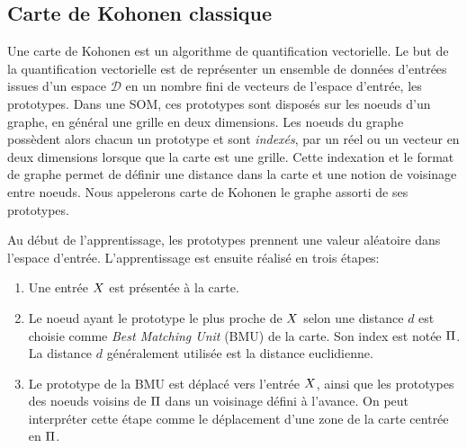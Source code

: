 \documentclass[../main]{subfiles}
\begin{document}
\subsection{Carte de Kohonen classique}

Une carte de Kohonen est un algorithme de quantification vectorielle. Le but de la quantification vectorielle est de représenter un ensemble de données d'entrées issues d'un espace $\mathcal{D}$ en un nombre fini de vecteurs de l'espace d'entrée, les prototypes. Dans une SOM, ces prototypes sont disposés sur les noeuds d'un graphe, en général une grille en deux dimensions.
Les noeuds du graphe possèdent alors chacun un prototype et sont \emph{indexés}, par un réel ou un vecteur en deux dimensions lorsque que la carte est une grille.
Cette indexation et le format de graphe permet de définir une distance dans la carte et une notion de voisinage entre noeuds.
Nous appelerons carte de Kohonen le graphe assorti de ses prototypes.

Au début de l'apprentissage, les prototypes prennent une valeur aléatoire dans l'espace d'entrée. 
L'apprentissage est ensuite réalisé en trois étapes:
\begin{enumerate}
\item Une entrée $X$ est présentée à la carte.
\item Le noeud ayant le prototype le plus proche de $X$ selon une distance $d$ est choisie comme \emph{Best Matching Unit} (BMU) de la carte. Son index est notée $\Pi$. La distance $d$ généralement utilisée est la distance euclidienne.
\item Le prototype de la BMU est déplacé vers l'entrée $X$, ainsi que les prototypes des noeuds voisins de $\Pi$ dans un voisinage défini à l'avance. On peut interpréter cette étape comme le déplacement d'une zone de la carte centrée en $\Pi$.
\end{enumerate}
\end{document}
